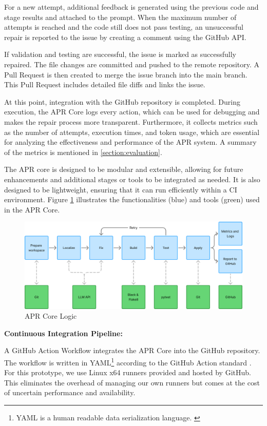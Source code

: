 For a new attempt, additional feedback is generated using the previous code and stage results and attached to the prompt. When the maximum number of attempts is reached and the code still does not pass testing, an unsuccessful repair is reported to the issue by creating a comment using the GitHub API.

If validation and testing are successful, the issue is marked as successfully repaired. The file changes are committed and pushed to the remote repository. A Pull Request is then created to merge the issue branch into the main branch. This Pull Request includes detailed file diffs and links the issue.

At this point, integration with the GitHub repository is completed. During execution, the APR Core logs every action, which can be used for debugging and makes the repair process more transparent. Furthermore, it collects metrics such as the number of attempts, execution times, and token usage, which are essential for analyzing the effectiveness and performance of the APR system. A summary of the metrics is mentioned in \ref{section:evaluation}.

The APR core is designed to be modular and extensible, allowing for future enhancements and additional stages or tools to be integrated as needed. It is also designed to be lightweight, ensuring that it can run efficiently within a CI environment. Figure \ref{fig:apr-core} illustrates the functionalities (blue) and tools (green) used in the APR Core.

\begin{figure}[H]
    \centering
    \includegraphics[width=1\textwidth]{images/flowcharts/apr_core.png}
    \caption{APR Core Logic}
    \label{fig:apr-core}
\end{figure}

\textbf{Continuous Integration Pipeline:}

A GitHub Action Workflow integrates the APR Core into the GitHub repository. The workflow is written in YAML\footnote{YAML is a human readable data serialization language. \cite{OfficialYAMLWeb}} according to the GitHub Action standard \cite{WorkflowSyntaxGitHub}. For this prototype, we use Linux x64 runners provided and hosted by GitHub. This eliminates the overhead of managing our own runners but comes at the cost of uncertain performance and availability.

